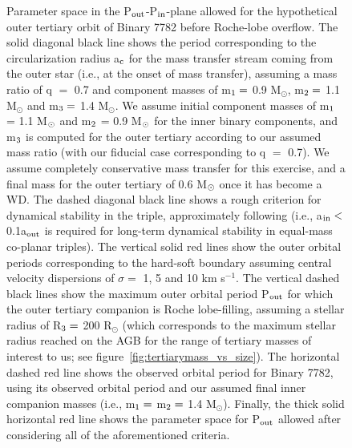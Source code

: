 \documentclass{aastex62}
\begin{document}
\begin{figure}[ht!]
\caption{Parameter space in the P$_{\rm out}$-P$_{\rm in}$-plane
  allowed for the hypothetical outer tertiary orbit of Binary 7782
  before Roche-lobe overflow.  The solid diagonal black line shows the
  period corresponding to the circularization radius a$_{\rm c}$ for
  the mass transfer stream coming from the outer star (i.e., at the
  onset of mass transfer), assuming a mass ratio of q $=$ 0.7 and
  component masses of m$_{\rm 1} =$ 0.9 M$_{\odot}$, m$_{\rm 2} =$ 1.1
  M$_{\odot}$ and m$_{\rm 3} =$ 1.4 M$_{\odot}$.  We assume initial
  component masses of m$_{\rm 1}$ = 1.1 M$_{\rm \odot}$ and m$_{\rm
    2}$ = 0.9 M$_{\rm \odot}$ for the inner binary components, and
  m$_{\rm 3}$ is computed for the outer tertiary according to our
  assumed mass ratio (with our fiducial case corresponding to q $=$
  0.7).  We assume completely conservative mass transfer for this
  exercise, and a final mass for the outer tertiary of 0.6 M$_{\rm
    \odot}$ once it has become a WD.  The dashed diagonal black line
  shows a rough criterion for dynamical stability in the triple,
  approximately following \citet{mardling99} (i.e., a$_{\rm in} <$
  0.1a$_{\rm out}$ is required for long-term dynamical stability in
  equal-mass co-planar triples).  The vertical solid red lines show
  the outer orbital periods corresponding to the hard-soft boundary
  assuming central velocity dispersions of $\sigma =$ 1, 5 and 10 km
  s$^{-1}$.  The vertical dashed black lines show the maximum outer
  orbital period P$_{\rm out}$ for which the outer tertiary companion
  is Roche lobe-filling, assuming a stellar radius of R$_{\rm 3} =$
  200 R$_{\odot}$ (which corresponds to the maximum stellar radius
  reached on the AGB for the range of tertiary masses of interest to
  us; see figure~\ref{fig:tertiarymass_vs_size}).  The horizontal dashed red line shows the observed orbital
  period for Binary 7782, using its observed orbital period and our
  assumed final inner companion masses (i.e., m$_{\rm 1} =$ m$_{\rm 2}
  =$ 1.4 M$_{\odot}$).  Finally, the thick solid horizontal red line
  shows the parameter space for P$_{\rm out}$ allowed after
  considering all of the aforementioned criteria.  
\label{fig:fig2}}
\end{figure}
\end{document}
